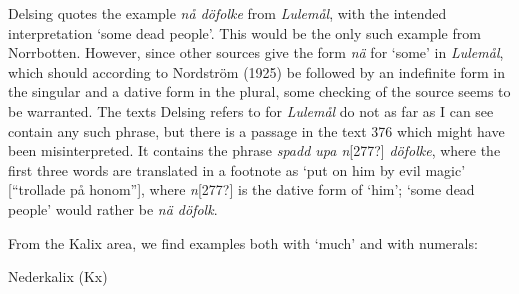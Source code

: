 \begin{styleBodyTextFirst}
Delsing quotes the example \textit{nå döfolke }from \textit{Lulemål}, with the intended interpretation ‘some dead people’. This would be the only such example from Norrbotten. However, since other sources give the form \textit{nä} for ‘some’ in \textit{Lulemål}, which should according to Nordström (1925) be followed by an indefinite form in the singular and a dative form in the plural, some checking of the source seems to be warranted. The texts Delsing refers to for \textit{Lulemål} do not as far as I can see contain any such phrase, but there is a passage in the text 376 which might have been misinterpreted. It contains the phrase \textit{spadd upa n}[277?]\textit{ döfolke}, where the first three words are translated in a footnote as ‘put on him by evil magic’ [“trollade på honom”], where \textit{n}[277?] is the dative form of ‘him’; ‘some dead people’ would rather be \textit{nä döfolk}. 

\end{styleBodyTextFirst}

\begin{styleBodytextC}
From the Kalix area, we find examples both with ‘much’ and with numerals:

\end{styleBodytextC}


\begin{listWWNumileveli}
\item 

\begin{styleExample}
Nederkalix (Kx) 

\end{styleExample}

\end{listWWNumileveli}

\begin{listWWNumxxxviileveli}
\item 

\end{listWWNumxxxviileveli}

